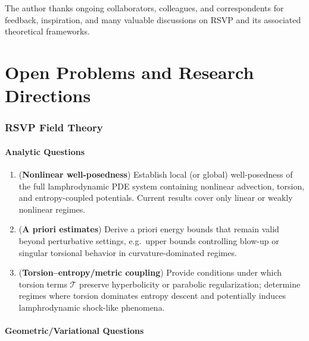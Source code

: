 \documentclass[12pt]{article}
\theoremstyle{plain}
\theoremstyle{definition}
\theoremstyle{remark}
\begin{document}
The author thanks ongoing collaborators, colleagues, and correspondents 
for feedback, inspiration, and many valuable discussions on RSVP and its
associated theoretical frameworks.


\appendix
\part{Open Problems and Research Directions}


\section{RSVP Field Theory}

\subsection{Analytic Questions}

\begin{enumerate}
    \item ({\bf Nonlinear well-posedness})
    Establish local (or global) well-posedness of the full lamphrodynamic PDE
    system containing nonlinear advection, torsion, and entropy-coupled
    potentials. Current results cover only linear or weakly nonlinear regimes.

    \item ({\bf A priori estimates})
    Derive a priori energy bounds that remain valid beyond perturbative
    settings, e.g.\ upper bounds controlling blow-up or singular torsional
    behavior in curvature-dominated regimes.

    \item ({\bf Torsion–entropy/metric coupling})
    Provide conditions under which torsion terms $\mathcal{T}$ preserve
    hyperbolicity or parabolic regularization; determine regimes where torsion
    dominates entropy descent and potentially induces lamphrodynamic
    shock-like phenomena.
\end{enumerate}


\subsection{Geometric/Variational Questions}
\end{document}
